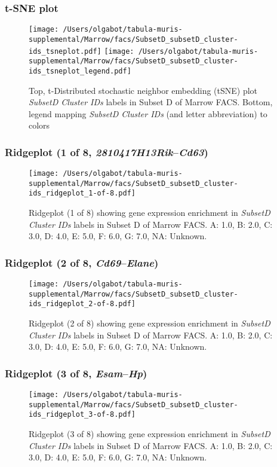 \clearpage
\subsubsection{t-SNE plot}
\begin{figure}[h]
\centering
\texttt{[image: /Users/olgabot/tabula-muris-supplemental/Marrow/facs/SubsetD\_subsetD\_cluster-ids\_tsneplot.pdf]}
\texttt{[image: /Users/olgabot/tabula-muris-supplemental/Marrow/facs/SubsetD\_subsetD\_cluster-ids\_tsneplot\_legend.pdf]}
\caption{Top, t-Distributed stochastic neighbor embedding (tSNE) plot  \emph{SubsetD Cluster IDs} labels in Subset D of Marrow FACS. Bottom, legend mapping \emph{SubsetD Cluster IDs} (and letter abbreviation) to colors}
\end{figure}


\clearpage

\subsubsection{Ridgeplot (1 of 8, \emph{2810417H13Rik}--\emph{Cd63})}
\begin{figure}[h]
\centering
\texttt{[image: /Users/olgabot/tabula-muris-supplemental/Marrow/facs/SubsetD\_subsetD\_cluster-ids\_ridgeplot\_1-of-8.pdf]}

\caption{ Ridgeplot (1 of 8)  showing gene expression enrichment in \emph{SubsetD Cluster IDs} labels in Subset D of Marrow FACS. A: 1.0, B: 2.0, C: 3.0, D: 4.0, E: 5.0, F: 6.0, G: 7.0, NA: Unknown.}
\end{figure}


\clearpage

\subsubsection{Ridgeplot (2 of 8, \emph{Cd69}--\emph{Elane})}
\begin{figure}[h]
\centering
\texttt{[image: /Users/olgabot/tabula-muris-supplemental/Marrow/facs/SubsetD\_subsetD\_cluster-ids\_ridgeplot\_2-of-8.pdf]}

\caption{ Ridgeplot (2 of 8)  showing gene expression enrichment in \emph{SubsetD Cluster IDs} labels in Subset D of Marrow FACS. A: 1.0, B: 2.0, C: 3.0, D: 4.0, E: 5.0, F: 6.0, G: 7.0, NA: Unknown.}
\end{figure}


\clearpage

\subsubsection{Ridgeplot (3 of 8, \emph{Esam}--\emph{Hp})}
\begin{figure}[h]
\centering
\texttt{[image: /Users/olgabot/tabula-muris-supplemental/Marrow/facs/SubsetD\_subsetD\_cluster-ids\_ridgeplot\_3-of-8.pdf]}

\caption{ Ridgeplot (3 of 8)  showing gene expression enrichment in \emph{SubsetD Cluster IDs} labels in Subset D of Marrow FACS. A: 1.0, B: 2.0, C: 3.0, D: 4.0, E: 5.0, F: 6.0, G: 7.0, NA: Unknown.}
\end{figure}


